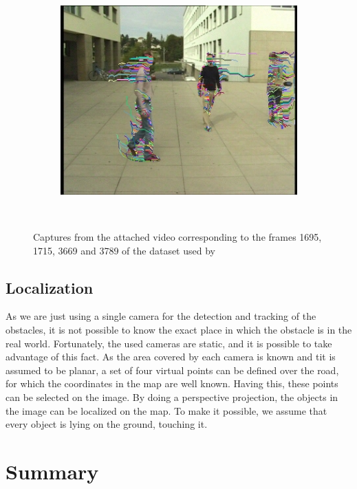 \begin{figure}[t]
        ~
        \begin{subfigure}[b]{0.24\textwidth}
                \centering
                \caption{~}
                \includegraphics[width=\textwidth, trim=6 0 5 1, clip]{fig8.jpg}
                \label{fig:cp02_videoCapture4}
        \end{subfigure}%
        \caption{Captures from the attached video corresponding to the frames 1695, 1715, 3669 and 3789 of the dataset used by \cite{berclaz2011multiple}}\label{fig:cp02_videoCaptures}
\end{figure}

\subsection{Localization}\label{ch:chapter02_01_03}

As we are just using a single camera for the detection and tracking of the obstacles, it is not possible to know the exact place in which the obstacle is in the real world. Fortunately, the used cameras are static, and it is possible to take advantage of this fact. As the area covered by each camera is known and tit is assumed to be planar, a set of four virtual points can be defined over the road, for which the coordinates in the map are well known.
Having this, these points can be selected on the image. By doing a perspective projection, the objects in the image can be localized on the map. To make it possible, we assume that every object is lying on the ground, touching it.

\section{Summary}\label{ch:chapter02_03}

